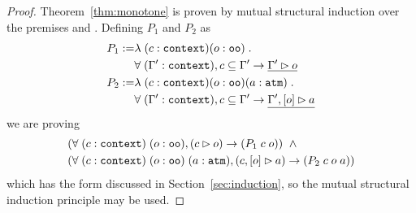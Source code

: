 \begin{proof}

Theorem~\ref{thm:monotone} is proven by mutual structural induction over the premises \seqsl{\beta} and \bchsl{\beta}{\alpha}. Defining $P_1$ and $P_2$ as
\begin{align*}
P_1 :=& \lambda \; (c : \sltm{context}) (o : \sltm{oo}) \; . \\
& \forall \; (\inddyncon{} : \sltm{context}), c \subseteq \inddyncon{} \rightarrow \underline{\seqsl[\inddyncon{}]{o}} \\
P_2 :=& \lambda \; (c : \sltm{context}) (o : \sltm{oo}) (a : \sltm{atm}) \; . \\
& \forall \; (\inddyncon{} : \sltm{context}), c \subseteq \inddyncon{} \rightarrow \underline{\bchsl[\inddyncon{}]{o}{a}}
\end{align*}
we are proving
\begin{align*}
& (\forall \; (c : \sltm{context}) \; (o : \sltm{oo}), (\seqsl[c]{o}) \rightarrow (P_1 \; c \; o)) \;\; \wedge \\
& (\forall \; (c : \sltm{context}) \; (o : \sltm{oo}) \; (a : \sltm{atm}), (\bchsl[c]{o}{a}) \rightarrow (P_2 \; c \; o \; a))
\end{align*}
which has the form discussed in Section~\ref{sec:induction},
so the mutual structural induction principle may be used.




\end{proof}
